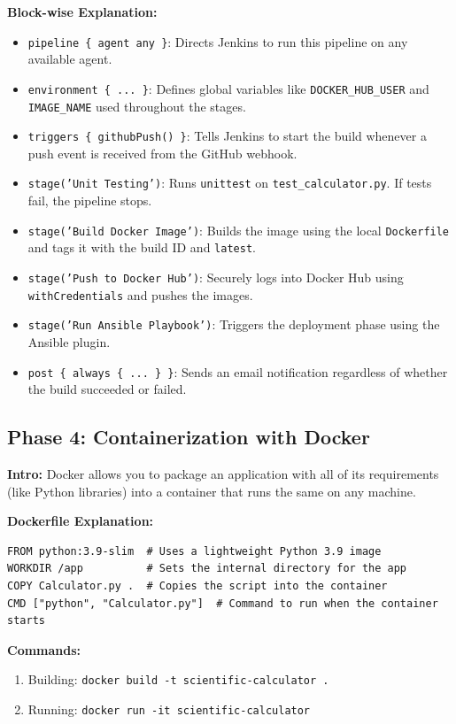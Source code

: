 \documentclass[12pt,a4paper]{article}
\begin{document}
\textbf{Block-wise Explanation:}
\begin{itemize}[noitemsep]
  \item \texttt{pipeline \{ agent any \}}: Directs Jenkins to run this pipeline on any available agent.
  \item \texttt{environment \{ ... \}}: Defines global variables like \texttt{DOCKER_HUB_USER} and \texttt{IMAGE_NAME} used throughout the stages.
  \item \texttt{triggers \{ githubPush() \}}: Tells Jenkins to start the build whenever a push event is received from the GitHub webhook.
  \item \texttt{stage('Unit Testing')}: Runs \texttt{unittest} on \texttt{test\_calculator.py}. If tests fail, the pipeline stops.
  \item \texttt{stage('Build Docker Image')}: Builds the image using the local \texttt{Dockerfile} and tags it with the build ID and \texttt{latest}.
  \item \texttt{stage('Push to Docker Hub')}: Securely logs into Docker Hub using \texttt{withCredentials} and pushes the images.
  \item \texttt{stage('Run Ansible Playbook')}: Triggers the deployment phase using the Ansible plugin.
  \item \texttt{post \{ always \{ ... \} \}}: Sends an email notification regardless of whether the build succeeded or failed.
\end{itemize}


\subsection{Phase 4: Containerization with Docker}

\textbf{Intro:} Docker allows you to package an application with all of its requirements (like Python libraries) into a container that runs the same on any machine.

\textbf{Dockerfile Explanation:}
\begin{verbatim}
FROM python:3.9-slim  # Uses a lightweight Python 3.9 image
WORKDIR /app          # Sets the internal directory for the app
COPY Calculator.py .  # Copies the script into the container
CMD ["python", "Calculator.py"]  # Command to run when the container starts
\end{verbatim}

\textbf{Commands:}
\begin{enumerate}[noitemsep]
  \item Building: \texttt{docker build -t scientific-calculator .}
  \item Running: \texttt{docker run -it scientific-calculator}
\end{enumerate}
\end{document}
